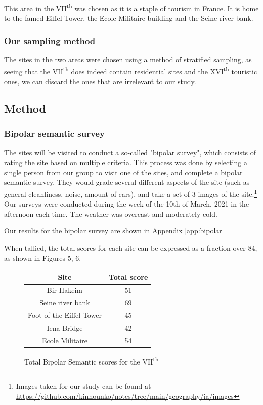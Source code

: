 \documentclass[11pt,letterpaper]{article}
\begin{document}
This area in the VII\textsuperscript{th} was chosen as it is a staple of tourism in France. It is home to the famed Eiffel Tower, the Ecole Militaire building and the Seine river bank.

\subsubsection{Our sampling method}

The sites in the two areas were chosen using a method of stratified sampling, as seeing that the VII\textsuperscript{th} does indeed contain residential sites and the XVI\textsuperscript{th} touristic ones, we can discard the ones that are irrelevant to our study.

\subsection{Method}

\subsubsection{Bipolar semantic survey}

The sites will be visited to conduct a so-called "bipolar survey", which consists of rating the site based on multiple criteria. This process was done by selecting a single person from our group to visit one of the sites, and complete a bipolar semantic survey. They would grade several different aspects of the site (such as general cleanliness, noise, amount of cars), and take a set of 3 images of the site.\footnote{Images taken for our study can be found at \url{https://github.com/kinnounko/notes/tree/main/geography/ia/images}} Our surveys were conducted during the week of the 10th of March, 2021 in the afternoon each time. The weather was overcast and moderately cold.

Our results for the bipolar survey are shown in Appendix \ref{app:bipolar}

When tallied, the total scores for each site can be expressed as a fraction over 84, as shown in Figures 5, 6.

\begin{figure}
    \begin{center}
        \begin{tabular}{||c c||}
            \hline
            Site & Total score  \\ [0.5ex]
            \hline\hline
            Bir-Hakeim                 & 51    \\
            \hline
            Seine river bank           & 69    \\
            \hline
            Foot of the Eiffel Tower   & 45    \\
            \hline
            Iena Bridge                & 42    \\
            \hline
            Ecole Militaire            & 54    \\ [1ex]
            \hline
        \end{tabular}
    \end{center}
    \caption{Total Bipolar Semantic scores for the VII\textsuperscript{th}}
\end{figure}
\end{document}

